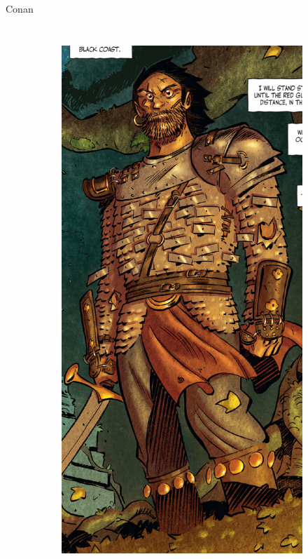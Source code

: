 \begin{frame}{Conan}
\begin{columns}
\begin{figure}[htp]
\begin{subfigure}[b]{0.3\textwidth}
				\includegraphics[width=\textwidth]{img/conan/Ablaze}
			\end{subfigure}
			~
			\begin{subfigure}[b]{0.27\textwidth}

\end{subfigure}
\end{figure}
\end{columns}
\end{frame}
